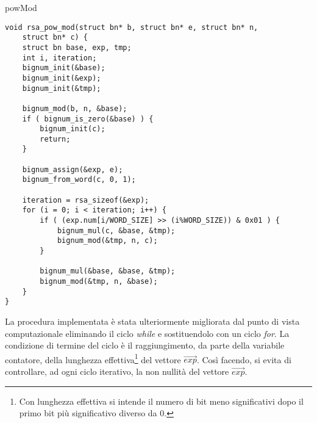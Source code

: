 \begin{algorithm}[H]
	\caption{powMod}
	\label{alg:powMod}
	\DontPrintSemicolon
\end{algorithm}

\begin{lstlisting}[basicstyle=\ttfamily\small, backgroundcolor=\color{bgCode}]
void rsa_pow_mod(struct bn* b, struct bn* e, struct bn* n,
    struct bn* c) {
    struct bn base, exp, tmp;
    int i, iteration;
    bignum_init(&base);
    bignum_init(&exp);
    bignum_init(&tmp);
    
    bignum_mod(b, n, &base);
    if ( bignum_is_zero(&base) ) {
        bignum_init(c);
        return;
    }
    
    bignum_assign(&exp, e);
    bignum_from_word(c, 0, 1);
    
    iteration = rsa_sizeof(&exp);
    for (i = 0; i < iteration; i++) {
        if ( (exp.num[i/WORD_SIZE] >> (i%WORD_SIZE)) & 0x01 ) {
            bignum_mul(c, &base, &tmp);
            bignum_mod(&tmp, n, c);
        }
        
        bignum_mul(&base, &base, &tmp);
        bignum_mod(&tmp, n, &base);
    }
}
\end{lstlisting}

La procedura implementata è stata ulteriormente migliorata dal punto di vista computazionale eliminando il ciclo \emph{while} e sostituendolo con un ciclo \emph{for}. La condizione di termine del ciclo è il raggiungimento, da parte della variabile contatore, della lunghezza effettiva\footnote{Con lunghezza effettiva si intende il numero di bit meno significativi dopo il primo bit più significativo diverso da $0$.} del vettore $\vec{exp}$. Così facendo, si evita di controllare, ad ogni ciclo iterativo, la non nullità del vettore $\vec{exp}$.





























